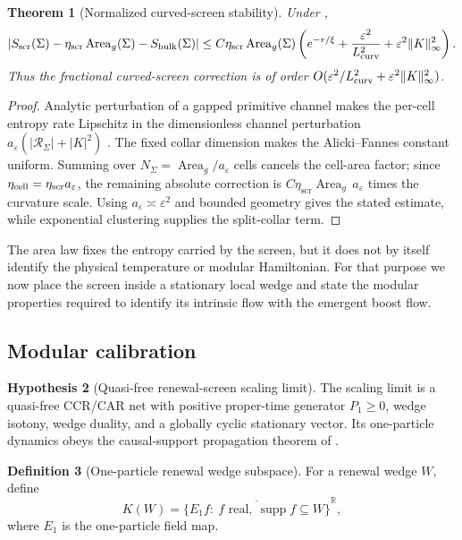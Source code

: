 \documentclass[11pt]{article}
\newtheorem{theorem}{Theorem}[section]
\theoremstyle{definition}
\newtheorem{definition}[theorem]{Definition}
\newtheorem{hypothesis}[theorem]{Hypothesis}
\theoremstyle{remark}
\newcommand{\R}{\mathbb R}
\newcommand{\eps}{\varepsilon}
\newcommand{\Area}{\operatorname{Area}}
\newcommand{\bulk}{\mathrm{bulk}}
\newcommand{\etaScr}{\eta_{\mathrm{scr}}}
\DeclareMathOperator{\supp}{supp}
\begin{document}
\begin{theorem}[Normalized curved-screen stability]
\label{thm:curved-screen}
Under ,
\[
 \left|S_{\rm scr}(\Sigma)-\etaScr\Area_g(\Sigma)-S_{\bulk}(\Sigma)\right|
 \le C\etaScr\Area_g(\Sigma)
 \left(e^{-r/\xi}+\frac{\eps^2}{L_{\rm curv}^2}
 +\eps^2\|K\|_\infty^2\right).
\]
Thus the fractional curved-screen correction is of order
$O(\eps^2/L_{\rm curv}^2+\eps^2\|K\|_\infty^2)$.
\end{theorem}

\begin{proof}
Analytic perturbation of a gapped primitive channel makes the per-cell entropy
rate Lipschitz in the dimensionless channel perturbation
$a_\eps(|\mathcal R_\Sigma|+|K|^2)$ \cite{Kato,WolfPerez}.  The fixed collar
dimension makes the Alicki--Fannes constant uniform.  Summing over
$N_\Sigma=\Area_g/a_\eps$ cells cancels the cell-area factor; since
$\eta_{\rm cell}=\etaScr a_\eps$, the remaining absolute correction is
$C\etaScr\Area_g\,a_\eps$ times the curvature scale.  Using
$a_\eps\asymp\eps^2$ and bounded geometry gives the stated estimate, while
exponential clustering supplies the split-collar term.
\end{proof}

The area law fixes the entropy carried by the screen, but it does not by itself
identify the physical temperature or modular Hamiltonian.  For that purpose we
now place the screen inside a stationary local wedge and state the modular
properties required to identify its intrinsic flow with the emergent boost
flow.


\subsection{Modular calibration}

\begin{hypothesis}[Quasi-free renewal-screen scaling limit]
\label{hyp:quasifree-screen}
The scaling limit is a quasi-free CCR/CAR net with positive proper-time generator
$P_1\ge0$, wedge isotony, wedge duality, and a globally cyclic stationary vector.
Its one-particle dynamics obeys the causal-support propagation theorem of
.
\end{hypothesis}

\begin{definition}[One-particle renewal wedge subspace]
\label{def:renewal-wedge-subspace}
For a renewal wedge $W$, define
\[
 K(W)=\overline{\{E_1f:\ f\text{ real},\ \supp f\subseteq W\}}^{\R},
\]
where $E_1$ is the one-particle field map.
\end{definition}
\end{document}

